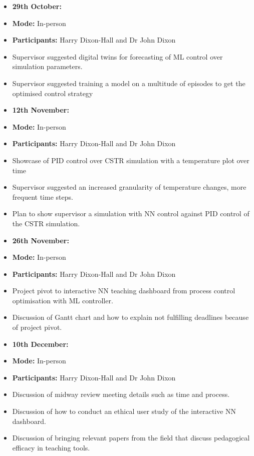 \documentclass{article}
\begin{document}
\begin{itemize}
\item \textbf{29th October:}
\item \textbf{Mode:} In-person
\item \textbf{Participants:} Harry Dixon-Hall and Dr John Dixon
\item Supervisor suggested digital twins for forecasting of ML control over simulation parameters.
\item Supervisor suggested training a model on a multitude of episodes to get the optimised control strategy
\end{itemize}

\begin{itemize}
\item \textbf{12th November:}
\item \textbf{Mode:} In-person
\item \textbf{Participants:} Harry Dixon-Hall and Dr John Dixon
\item Showcase of PID control over CSTR simulation with a temperature plot over time
\item Supervisor suggested an increased granularity of temperature changes, more frequent time steps.
\item Plan to show supervisor a simulation with NN control against PID control of the CSTR simulation.
\end{itemize}

\begin{itemize}
\item \textbf{26th November:}
\item \textbf{Mode:} In-person
\item \textbf{Participants:} Harry Dixon-Hall and Dr John Dixon
\item Project pivot to interactive NN teaching dashboard from process control optimisation with ML controller.
\item Discussion of Gantt chart and how to explain not fulfilling deadlines because of project pivot.
\end{itemize}

\begin{itemize}
\item \textbf{10th December:}
\item \textbf{Mode:} In-person
\item \textbf{Participants:} Harry Dixon-Hall and Dr John Dixon
\item Discussion of midway review meeting details such as time and process.
\item Discussion of how to conduct an ethical user study of the interactive NN dashboard.
\item Discussion of bringing relevant papers from the field that discuss pedagogical efficacy in teaching tools.
\end{itemize}
\end{document}
